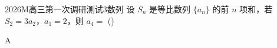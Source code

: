 
\begin{problem}{2026}{M}{高三第一次调研测试}{3}{数列}
设 $S_n$ 是等比数列 $\{a_n\}$ 的前 $n$ 项和，若 $S_2=3a_2$，$a_1=2$，则 $a_4=$ (\hspace{1cm})

\begin{choices}
\end{choices}
\end{problem}

\begin{answer}
A
\end{answer}

\begin{solutions}

\end{solutions}